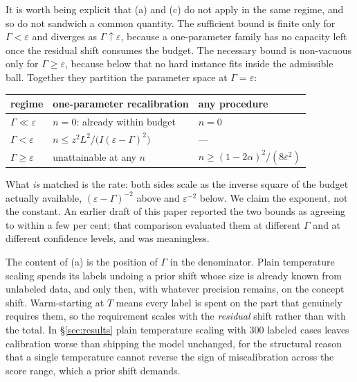 \begin{remark}\label{rem:regimes}
It is worth being explicit that (a) and (c) do not apply in the same regime, and
so do not sandwich a common quantity.  The sufficient bound is finite only for
$\Gamma<\varepsilon$ and diverges as $\Gamma\uparrow\varepsilon$, because a
one-parameter family has no capacity left once the residual shift consumes the
budget.  The necessary bound is non-vacuous only for $\Gamma\ge\varepsilon$,
because below that no hard instance fits inside the admissible ball.  Together
they partition the parameter space at $\Gamma=\varepsilon$:

\begin{center}
\begin{tabular}{lll}
\toprule
regime & one-parameter recalibration & any procedure \\
\midrule
$\Gamma \ll \varepsilon$ & $n=0$: already within budget & $n=0$ \\
$\Gamma < \varepsilon$ & $n \le z^2 L^2 / \big(I(\varepsilon-\Gamma)^2\big)$ & --- \\
$\Gamma \ge \varepsilon$ & unattainable at any $n$ & $n \ge (1-2\alpha)^2/(8\varepsilon^2)$ \\
\bottomrule
\end{tabular}
\end{center}

What \emph{is} matched is the rate: both sides scale as the inverse square of
the budget actually available, $(\varepsilon-\Gamma)^{-2}$ above and
$\varepsilon^{-2}$ below.  We claim the exponent, not the constant.  An earlier
draft of this paper reported the two bounds as agreeing to within a few per
cent; that comparison evaluated them at different $\Gamma$ and at different
confidence levels, and was meaningless.
\end{remark}

\begin{remark}
The content of (a) is the position of $\Gamma$ in the denominator.  Plain
temperature scaling spends its labels undoing a prior shift whose size is
already known from unlabeled data, and only then, with whatever precision
remains, on the concept shift.  Warm-starting at $T$ means every label is spent
on the part that genuinely requires them, so the requirement scales with the
\emph{residual} shift rather than with the total.  In \S\ref{sec:results} plain
temperature scaling with 300 labeled cases leaves calibration worse than
shipping the model unchanged, for the structural reason that a single
temperature cannot reverse the sign of miscalibration across the score range,
which a prior shift demands.
\end{remark}

